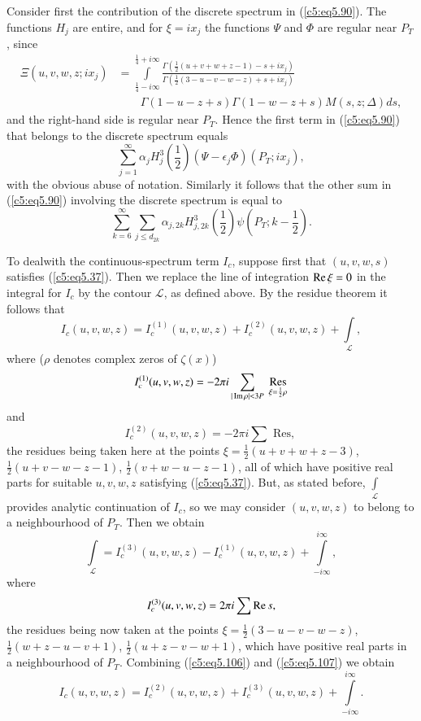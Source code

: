 Consider first the contribution of the discrete spectrum in
(\ref{c5:eq5.90}). The functions $H_j$ are entire, and for $\xi = i
x_j$ the functions $\Psi$ and $\Phi$ are regular near $P_T$, since 
\begin{align*}
 \Xi (u,v,w,z;i x_j) & = 
 \int\limits^{\frac{1}{4} + i \infty}_{\frac{1}{4} - i \infty}
 \frac{\Gamma (\frac{1}{2} (u+v+w+z-1) - s + i x_j )}{\Gamma
   (\frac{1}{2} (3-u-v-w-z) + s + i x_j)}\\ 
& \qquad \Gamma (1- u - z + s) \Gamma (1-w-z+s) M (s, z;\Delta) ds, 
\end{align*}
and the right-hand side is regular near $P_T$. Hence the first term in
(\ref{c5:eq5.90}) that belongs to the discrete spectrum equals 
$$
\sum\limits^\infty_{j=1}  \alpha_j H^3_{j} \left(\frac{1}{2} \right)
(\Psi - \epsilon_j \Phi) (P_T ; i x_j), 
$$
with the obvious abuse of notation. Similarly it follows that the
other sum in (\ref{c5:eq5.90}) involving the discrete spectrum is
equal to  
$$ 
\sum\limits^\infty_{k=6} \sum\limits_{j \leq d_{2k}} \alpha_{j,2k}
H^3_{j,2k} \left(\frac{1}{2} \right) \psi \left(P_T; k -\frac{1}{2}
\right). 
$$

To deal\pageoriginale with the continuous-spectrum term $I_c$, suppose
first that $(u,v,w,s)$ satisfies (\ref{c5:eq5.37}). Then we replace
the line of integration $\operatorname{Re} \xi = 0$ in the integral for $I_c$ by the
contour $\mathscr{L}$, as defined above. By the residue theorem it
follows that  
\begin{equation} 
I_c(u,v,w,z) = I_c^{(1)}(u,v,w,z) + I^{(2)}_c(u,v,w,z) +
\int\limits_{\mathscr{L}},  
\label{c5:eq5.106}
\end{equation}
where ($\rho$ denotes complex zeros of $\zeta(x)$) 
$$
I^{(1)}_c(u,v,w,z) = - 2 \pi i \sum\limits_{|\operatorname{Im} \rho| < 3 P} \;
\underset{\xi = \frac{1}{2} \rho}{\text{Res}}  
$$
and 
$$
I^{(2)}_c (u,v,w,z) = - 2 \pi i \sum \text{ Res, }
$$
the residues being taken here at the points $\xi =\frac{1}{2}
(u+v+w+z-3)$, $\frac{1}{2}(u+v-w-z-1)$, $\frac{1}{2} (v+w-u-z-1)$, all
of which have positive real parts for suitable $u,v,w,z$ satisfying
(\ref{c5:eq5.37}). But, as stated before, $\int\limits_{\mathscr{L}}$
provides analytic continuation of $I_c$, so we may consider
$(u,v,w,z)$ to belong to a neighbourhood of $P_T$. Then we obtain 
\begin{equation}
\int\limits_{\mathscr{L}} = I^{(3)}_c (u,v,w,z) - I^{(1)}_c(u,v,w,z) +
\int\limits^{i\infty}_{-i\infty},\label{c5:eq5.107} 
\end{equation}
where 
$$
I^{(3)}_c (u,v,w,z) = 2 \pi i \sum \operatorname{Re} s,
$$
the residues being now taken at the points $\xi = \frac{1}{2}
(3-u-v-w-z)$, $\frac{1}{2} (w+z-u-v+1)$, $\frac{1}{2} (u+z-v-w+1)$,
which have positive real parts in a neighbourhood of $P_T$. Combining
(\ref{c5:eq5.106}) and (\ref{c5:eq5.107}) we obtain 
$$
I_c (u,v,w,z) = I^{(2)}_c (u,v,w,z) + I^{(3)}_c (u,v,w,z) +
\int\limits^{i\infty}_{-i\infty}.  
$$

